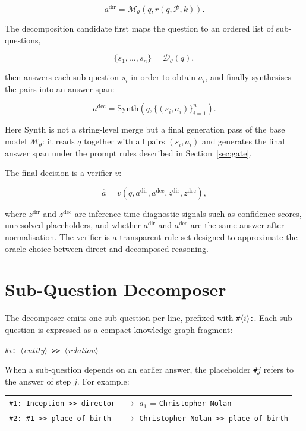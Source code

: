 \documentclass{nthu_thesis}
\begin{document}
\begin{thesiscjk}
\[
    a^{\mathrm{dir}} = \mathcal{M}_\theta(q, r(q, \mathcal{P}, k)).
\]

The decomposition candidate first maps the question to an ordered list of sub-questions,

\[
    \{s_1, \ldots, s_n\}=\mathcal{D}_\theta(q),
\]

then answers each sub-question $s_i$ in order to obtain $a_i$, and finally synthesises the pairs into an answer span:

\[
    a^{\mathrm{dec}} = \mathrm{Synth}\left(q, \{(s_i, a_i)\}_{i=1}^{n}\right).
\]

Here $\mathrm{Synth}$ is not a string-level merge but a final generation pass of the base model $\mathcal{M}_\theta$: it reads $q$ together with all pairs $(s_i, a_i)$ and generates the final answer span under the prompt rules described in Section~\ref{sec:gate}.

The final decision is a verifier $v$:

\[
    \hat{a}=v\left(q, a^{\mathrm{dir}}, a^{\mathrm{dec}}, z^{\mathrm{dir}}, z^{\mathrm{dec}}\right),
\]

where $z^{\mathrm{dir}}$ and $z^{\mathrm{dec}}$ are inference-time diagnostic signals such as confidence scores, unresolved placeholders, and whether $a^{\mathrm{dir}}$ and $a^{\mathrm{dec}}$ are the same answer after normalisation. The verifier is a transparent rule set designed to approximate the oracle choice between direct and decomposed reasoning.

\section{Sub-Question Decomposer}
\label{sec:decomposer}

The decomposer emits one sub-question per line, prefixed with \texttt{\#}$\langle i \rangle$\texttt{:}. Each sub-question is expressed as a compact knowledge-graph fragment:

\begin{center}
    \texttt{\#}$i$\texttt{: }$\langle$\emph{entity}$\rangle$\texttt{ >> }$\langle$\emph{relation}$\rangle$
\end{center}

When a sub-question depends on an earlier answer, the placeholder \texttt{\#}$j$ refers to the answer of step $j$. For example:

\begin{center}
\small
\begin{tabular}{@{}l@{\quad}l@{}}
    \texttt{\#1: Inception >> director} & $\rightarrow$ $a_1$ = \texttt{Christopher Nolan}\\
    \texttt{\#2: \#1 >> place of birth} & $\rightarrow$ \texttt{Christopher Nolan >> place of birth}
\end{tabular}
\end{center}


\end{thesiscjk}
\end{document}
